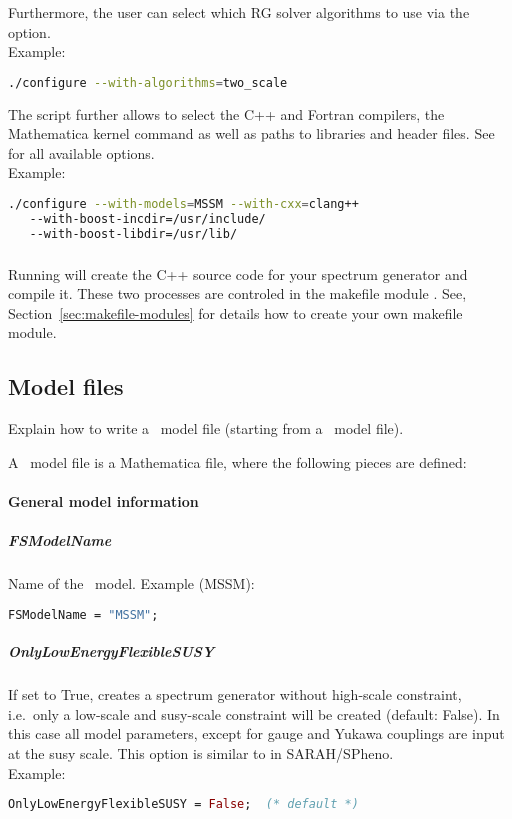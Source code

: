 Furthermore, the user can select which RG solver algorithms to use via
the  option.\\
Example:
%
\begin{lstlisting}[language=bash]
./configure --with-algorithms=two_scale
\end{lstlisting}

The  script further allows to select the C++ and
Fortran compilers, the Mathematica kernel command as well as paths to
libraries and header files.  See
 for all available options.\\
Example:
%
\begin{lstlisting}[language=bash]
./configure --with-models=MSSM --with-cxx=clang++
   --with-boost-incdir=/usr/include/
   --with-boost-libdir=/usr/lib/
\end{lstlisting}

\subsubsection{}
\label{sec:make}

Running  will create the C++ source code for your spectrum
generator and compile it.  These two processes are controled in the
makefile module .  See,
Section~\ref{sec:makefile-modules} for details how to create your own
makefile module.

\subsection{Model files}
\label{sec:model-files}

Explain how to write a \flexisusy\ model file (starting from a \sarah\
model file).

A \flexisusy\ model file is a Mathematica file, where the following
pieces are defined:

\paragraph{General model information}

\subparagraph{FSModelName}
Name of the \flexisusy\ model.
Example (MSSM):
\begin{lstlisting}[language=Mathematica]
FSModelName = "MSSM";
\end{lstlisting}

\subparagraph{OnlyLowEnergyFlexibleSUSY} If set to True, creates a
spectrum generator without high-scale constraint, i.e.\ only a
low-scale and susy-scale constraint will be created (default: False).
In this case all model parameters, except for gauge and Yukawa
couplings are input at the susy scale.  This option is similar to
\code{OnlyLowEnergySPheno} in SARAH/SPheno.
\\
Example:
\begin{lstlisting}[language=Mathematica]
OnlyLowEnergyFlexibleSUSY = False;  (* default *)
\end{lstlisting}

